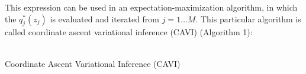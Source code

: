 \documentclass[a4paper,12pt]{article}
\numberwithin{equation}{section}
\begin{document}
This expression can be used in an expectation-maximization algorithm, in which the $q^*_j(z_j)$ is evaluated and iterated from $j=1\dots M$. This particular algorithm is called coordinate ascent variational inference (CAVI) (Algorithm 1):\\
\\
\begin{algorithm}[H]
\caption{Coordinate Ascent Variational Inference (CAVI)}
\BlankLine
{}
\end{algorithm}
\end{document}
